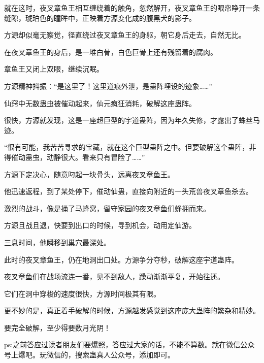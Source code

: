 \begin{this_body}
就在这时，夜叉章鱼王相互缠绕着的触角，忽然解开，夜叉章鱼王的眼帘睁开一条缝隙，琥珀色的瞳眸中，正映着方源变化成的腹黑犬的影子。

方源却似毫无察觉，径直绕过夜叉章鱼王的身躯，朝它身后走去，自然无比。

在夜叉章鱼王的身后，是一堆白骨，白色巨骨上还有残留着的腐肉。

章鱼王又闭上双眼，继续沉眠。

方源精神抖振：“是这里了！这里道痕外泄，是蛊阵埋设的迹象……”

仙窍中无数蛊虫被催动起来，仙元疯狂消耗，破解这座蛊阵。

很快，方源就发现，这是一座超巨型的宇道蛊阵，因为年久失修，才露出了蛛丝马迹。

“很有可能，我苦苦寻求的宝藏，就在这个巨型蛊阵之中。但要破解这个蛊阵，非得催动蛊虫，动静很大。看来只有冒险了……”

方源下定决心，随意叼起一块骨头，远离夜叉章鱼王。

他迅速返程，到了某处停下，催动仙蛊，直接向附近的一头荒兽夜叉章鱼杀去。

激烈的战斗，像是捅了马蜂窝，留守家园的夜叉章鱼们蜂拥而来。

方源且战且退，快要到出口的时候，寻到机会，动用定仙游。

三息时间，他瞬移到巢穴最深处。

此时的夜叉章鱼王，仍在地洞出口处。方源争分夺秒，破解这座宇道蛊阵。

夜叉章鱼们在战场流连一番，见不到敌人，躁动渐渐平复，开始往还。

它们在洞中穿梭的速度很快，方源时间极其有限。

更不妙的是，真正着手破解的时候，方源越发感觉到这座庞大蛊阵的繁杂和精妙。

要完全破解，至少得要数月光阴！

ps:之前答应过读者朋友们要爆照，答应过大家的话，不能不算数。就在微信公众号上爆吧。玩微信的，搜索蛊真人公众号，添加即可。

\end{this_body}

